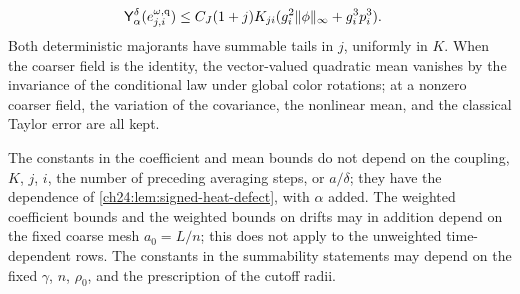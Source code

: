 \begin{theorem}
\begin{enumerate}
\begin{align*}
 \mathsf Y_{\alpha}^{\delta}(e_{j,i}^{\omega,\mathrm q})&\le C_J(1+j)K_{ji}(g_i^2\lVert \phi\rVert_\infty+g_i^3p_i^3).
\end{align*}
Both deterministic majorants have summable tails in $j$, uniformly in $K$. When the coarser field is the identity, the vector-valued quadratic mean vanishes by the invariance of the conditional law under global color rotations; at a nonzero coarser field, the variation of the covariance, the nonlinear mean, and the classical Taylor error are all kept.
\end{enumerate}
The constants in the coefficient and mean bounds do not depend on the coupling, $K$, $j$, $i$, the number of preceding averaging steps, or $a/\delta$; they have the dependence of \cref{ch24:lem:signed-heat-defect}, with $\alpha$ added. The weighted coefficient bounds and the weighted bounds on drifts may in addition depend on the fixed coarse mesh $a_0=L/n$; this does not apply to the unweighted time-dependent rows. The constants in the summability statements may depend on the fixed $\gamma$, $n$, $\rho_0$, and the prescription of the cutoff radii.
\end{theorem}

